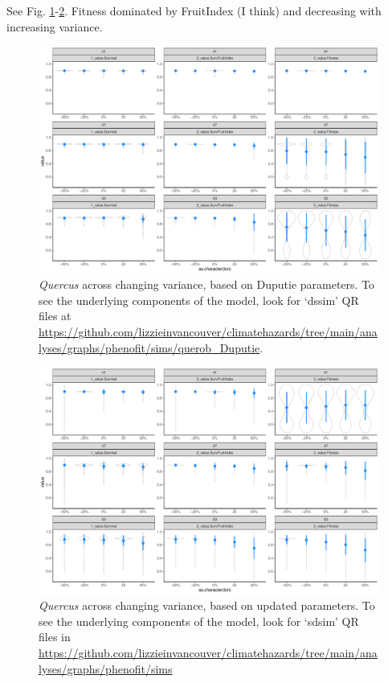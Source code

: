 \documentclass[11pt,letter]{article}
\begin{document}
See Fig. \ref{fig:simssdDup}-\ref{fig:simssdUp}. Fitness dominated by FruitIndex (I think) and decreasing with increasing variance.
\begin{figure}[h!]
 \begin{center}
\noindent \includegraphics[width=1\textwidth]{..//analyses/graphs/phenofit/sims/querob_Duputie/sdsim_3metricsQR.pdf}
  \caption{\emph{Quercus} across changing variance, based on Duputie parameters. To see the underlying components of the model, look for `dssim' QR files at \url{https://github.com/lizzieinvancouver/climatehazards/tree/main/analyses/graphs/phenofit/sims/querob_Duputie}.}
  \label{fig:simssdDup}
  \end{center}
\end{figure}

\begin{figure}[h!]
 \begin{center}
\noindent \includegraphics[width=1\textwidth]{..//analyses/graphs/phenofit/sims/metrics3/sdsim_3metricsQR.pdf}
  \caption{\emph{Quercus} across changing variance, based on updated parameters. To see the underlying components of the model, look for `sdsim' QR files in \url{https://github.com/lizzieinvancouver/climatehazards/tree/main/analyses/graphs/phenofit/sims}}
  \label{fig:simssdUp}
  \end{center}
\end{figure}
\end{document}
